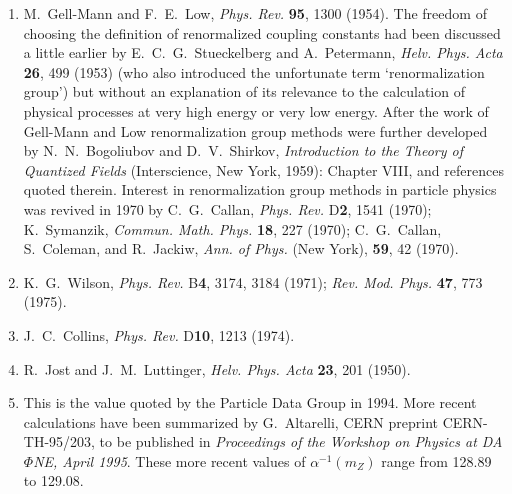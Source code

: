 


\begin{enumerate}
  \setlength{\itemsep}{0.35\baselineskip}
  \item {}\label{ch18-ref-1}
  M.~Gell-Mann and F.~E.~Low, \textit{Phys. Rev.} \textbf{95}, 1300 (1954). The freedom of choosing the definition of renormalized coupling constants had been discussed a little earlier by E.~C.~G.~Stueckelberg and A.~Petermann, \textit{Helv. Phys. Acta} \textbf{26}, 499 (1953) (who also introduced the unfortunate term `renormalization group') but without an explanation of its relevance to the calculation of physical processes at very high energy or very low energy. After the work of Gell-Mann and Low renormalization group methods were further developed by N.~N.~Bogoliubov and D.~V.~Shirkov, \textit{Introduction to the Theory of Quantized Fields} (Interscience, New York, 1959): Chapter VIII, and references quoted therein. Interest in renormalization group methods in particle physics was revived in 1970 by C.~G.~Callan, \textit{Phys. Rev.} D\textbf{2}, 1541 (1970); K.~Symanzik, \textit{Commun. Math. Phys.} \textbf{18}, 227 (1970); C.~G.~Callan, S.~Coleman, and R.~Jackiw, \textit{Ann. of Phys.} (New York), \textbf{59}, 42 (1970).

  \item {}\label{ch18-ref-2}
  K.~G.~Wilson, \textit{Phys. Rev.} B\textbf{4}, 3174, 3184 (1971); \textit{Rev. Mod. Phys.} \textbf{47}, 773 (1975).

  \item {}\label{ch18-ref-3}
  J.~C.~Collins, \textit{Phys. Rev.} D\textbf{10}, 1213 (1974).

  \item[3a.] \label{ch18-ref-3a}
  R.~Jost and J.~M.~Luttinger, \textit{Helv. Phys. Acta} \textbf{23}, 201 (1950).

  \item {}\label{ch18-ref-4}
  This is the value quoted by the Particle Data Group in 1994. More recent calculations have been summarized by G.~Altarelli, CERN preprint CERN-TH-95/203, to be published in \textit{Proceedings of the Workshop on Physics at DA$\Phi$NE, April 1995}. These more recent values of $\alpha^{-1}(m_Z)$ range from 128.89 to 129.08.


\end{enumerate}
